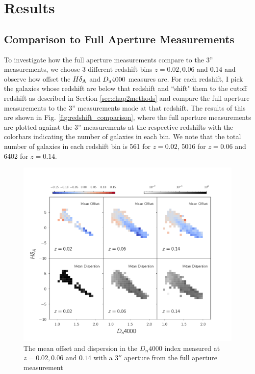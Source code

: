 \section{Results}
\subsection{Comparison to Full Aperture Measurements}
To investigate how the full aperture measurements compare to the 3'' measurements, we choose 3 different redshift bins $z = 0.02,0.06$ and $0.14$ and observe how offset the $H\delta_{\rm A}$ and $D_{\rm n}4000$ measures are. For each redshift, I pick the galaxies whose redshift are below that redshift and ``shift" them to the cutoff redshift as described in Section \ref{sec:chap2methods} and compare the full aperture measurements to the 3'' measurements made at that redshift. The results of this are shown in Fig. \ref{fig:redshift_comparison}, where the full aperture measurements are plotted against the 3'' measurements at the respective redshifts with the colorbars indicating the number of galaxies in each bin. We note that the total number of galaxies in each redshift bin is 561 for $z = 0.02$, 5016 for $z = 0.06$ and 6402 for $z = 0.14$.\\

\begin{figure}
\includegraphics[width=\textwidth]{figures/dn4000_full_aperture_comparisons.pdf}
\caption[The mean offset and dispersion in the $D_{n}4000$ index measured at $z = 0.02,0.06$ and $0.14$ with a $3''$ aperture from the full aperture measurement]{ The mean offset and dispersion in the $D_{n}4000$ index measured at $z = 0.02,0.06$ and $0.14$ with a $3''$ aperture from the full aperture measurement
\label{fig:offset_d4000}}
\end{figure}

